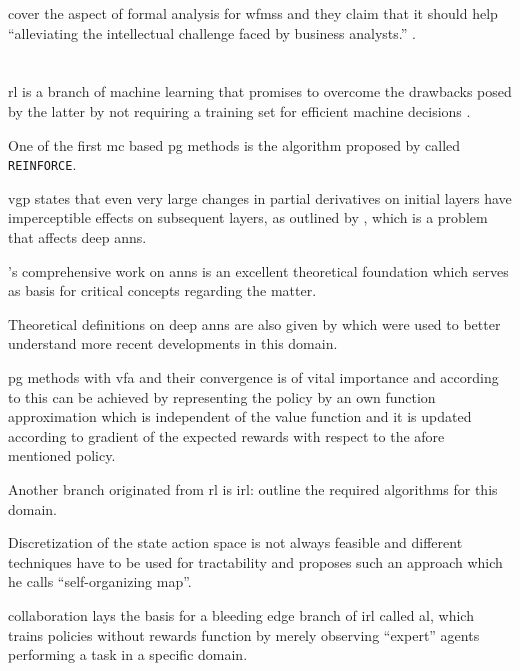 \citet{Sun2013} cover the aspect of formal analysis for \glspl{wfms} and they claim that it should help ``alleviating the intellectual challenge faced by business analysts.'' \citep[p. 2]{Sun2013}.

\section{}
\label{sec:rl}

\gls{rl} is a branch of machine learning that promises to overcome the drawbacks posed by the latter by not requiring a training set for efficient machine decisions \citep{Sutton2017}.

One of the first \gls{mc} based \gls{pg} methods is the algorithm proposed by \citet{Williams1992} called \texttt{REINFORCE}.

\gls{vgp} states that even very large changes in partial derivatives on initial layers have imperceptible effects on subsequent layers, as outlined by \citet{Bengio1994}, which is a problem that affects deep \glspl{ann}.

\citet{Haykin1998}'s comprehensive work on \glspl{ann} is an excellent theoretical foundation which serves as basis for critical concepts regarding the matter.

Theoretical definitions on deep \glspl{ann} are also given by \citet{Lecun1998} which were used to better understand more recent developments in this domain.

\gls{pg} methods with \gls{vfa} and their convergence is of vital importance and according to \citet{Sutton1999} this can be achieved by representing the policy by an own function approximation which is independent of the value function and it is updated according to gradient of the expected rewards with respect to the afore mentioned policy.

Another branch originated from \gls{rl} is \gls{irl}: \citet{Ng2000} outline the required algorithms for this domain.

Discretization of the state action space is not always feasible and different techniques have to be used for tractability and \citet{Smith2002} proposes such an approach which he calls ``self-organizing map''.

\citet{Abbeel2004} collaboration lays the basis for a bleeding edge branch of \gls{irl} called \gls{al}, which trains policies without rewards function by merely observing ``expert'' agents performing a task in a specific domain.

